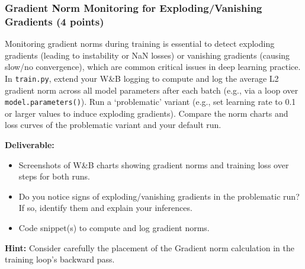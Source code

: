 \documentclass[11pt, oneside]{article}   	%
\begin{document}
\subsubsection*{Gradient Norm Monitoring for Exploding/Vanishing Gradients (4 points)}
Monitoring gradient norms during training is essential to detect exploding gradients (leading to instability or NaN losses) or vanishing gradients (causing slow/no convergence), which are common critical issues in deep learning practice. In \texttt{train.py}, extend your W\&B logging to compute and log the average L2 gradient norm across all model parameters after each batch (e.g., via a loop over \texttt{model.parameters()}). Run a `problematic' variant (e.g., set learning rate to 0.1 or larger values to induce exploding gradients). Compare the norm charts and loss curves of the problematic variant and your default run.

\noindent\textbf{Deliverable:}
\begin{itemize}
\item Screenshots of W\&B charts showing gradient norms and training loss over steps for both runs.
\item Do you notice signs of exploding/vanishing gradients in the problematic run? If so, identify them and explain your inferences. 
\item Code snippet(s) to compute and log gradient norms.
\end{itemize}
\textbf{Hint:} Consider carefully the placement of the Gradient norm calculation in the training loop's backward pass.
\end{document}
